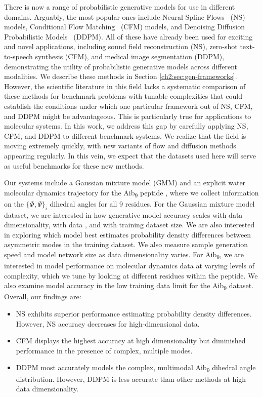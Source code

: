 There is now a range of probabilistic generative models for use in different domains. Arguably, the most popular ones include Neural Spline Flows~\cite{neural-splines} (NS) models, Conditional Flow Matching~\cite{CFM} (CFM) models, and Denoising Diffusion Probabilistic Models~\cite{Ho2020DDPM} (DDPM). All of these have already been used for exciting and novel applications, including sound field reconstruction \cite{2024soundfield} (NS), zero-shot text-to-speech synthesis \cite{kim2023pflow} (CFM), and medical image segmentation \cite{Guo2023} (DDPM), demonstrating the utility of probabilistic generative models across different modalities. We describe these methods in Section \ref{ch2:sec:gen-frameworks}. However, the scientific literature in this field lacks a systematic comparison of these methods for benchmark problems with tunable complexities that could establish the conditions under which one particular framework out of NS, CFM, and DDPM might be advantageous. This is particularly true for applications to molecular systems. In this work, we address this gap by carefully applying NS, CFM, and DDPM to different benchmark systems. We realize that the field is moving extremely quickly, with new variants of flow and diffusion methods appearing regularly. In this vein, we expect that the datasets used here will serve as useful benchmarks for these new methods.

Our systems include a Gaussian mixture model (GMM) and an explicit water molecular dynamics trajectory for the Aib\textsubscript{9} peptide \cite{shams-aib9, botan-peptide}, where we collect information on the $\{ \Phi,\Psi \}_i$ dihedral angles for all 9 residues. For the Gaussian mixture model dataset, we are interested in how generative model accuracy scales with data dimensionality, with data , and with training dataset size. We are also interested in exploring which model best estimates probability density differences between asymmetric modes in the training dataset. We also measure sample generation speed and model network size as data dimensionality varies. For Aib\textsubscript{9}, we are interested in model performance on molecular dynamics data at varying levels of complexity, which we tune by looking at different residues within the peptide. We also examine model accuracy in the low training data limit for the Aib\textsubscript{9} dataset. Overall, our findings are:

\begin{itemize}
    \item NS exhibits superior performance estimating probability density differences. However, NS accuracy decreases for high-dimensional data.
    \item CFM displays the highest accuracy at high dimensionality but diminished performance in the presence of complex, multiple modes.
    \item DDPM most accurately models the complex, multimodal Aib\textsubscript{9} dihedral angle distribution. However, DDPM is less accurate than other methods at high data dimensionality.
\end{itemize}

